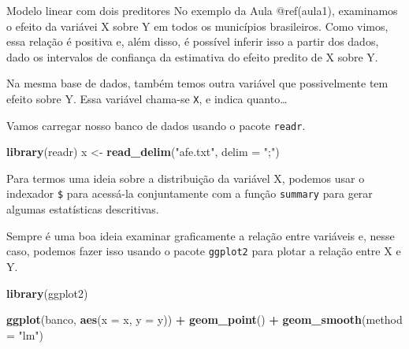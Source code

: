 \documentclass[
  9pt,
  ignorenonframetext,
  aspectratio=169]{beamer}
\newenvironment{Shaded}{\begin{snugshade}}{\end{snugshade}}
\newcommand{\DataTypeTok}[1]{\textcolor[rgb]{0.13,0.29,0.53}{#1}}
\newcommand{\KeywordTok}[1]{\textcolor[rgb]{0.13,0.29,0.53}{\textbf{#1}}}
\newcommand{\NormalTok}[1]{#1}
\newcommand{\OperatorTok}[1]{\textcolor[rgb]{0.81,0.36,0.00}{\textbf{#1}}}
\newcommand{\StringTok}[1]{\textcolor[rgb]{0.31,0.60,0.02}{#1}}
\begin{document}
\begin{frame}[fragile]{Modelo linear com dois preditores}
\protect\hypertarget{modelo-linear-com-dois-preditores}{}
No exemplo da Aula @ref(aula1), examinamos o efeito da variávei X sobre
Y em todos os municípios brasileiros. Como vimos, essa relação é
positiva e, além disso, é possível inferir isso a partir dos dados, dado
os intervalos de confiança da estimativa do efeito predito de X sobre Y.

Na mesma base de dados, também temos outra variável que possivelmente
tem efeito sobre Y. Essa variável chama-se \texttt{X}, e indica
quanto\ldots{}

Vamos carregar nosso banco de dados usando o pacote \texttt{readr}.

\begin{Shaded}
\begin{Highlighting}[]
\KeywordTok{library}\NormalTok{(readr)}
\NormalTok{x \textless{}{-}}\StringTok{ }\KeywordTok{read\_delim}\NormalTok{(}\StringTok{"afe.txt"}\NormalTok{, }\DataTypeTok{delim =} \StringTok{";"}\NormalTok{)}
\end{Highlighting}
\end{Shaded}

Para termos uma ideia sobre a distribuição da variável X, podemos usar o
indexador \texttt{\$} para acessá-la conjuntamente com a função
\texttt{summary} para gerar algumas estatísticas descritivas.

\begin{Shaded}
\end{Shaded}

Sempre é uma boa ideia examinar graficamente a relação entre variáveis
e, nesse caso, podemos fazer isso usando o pacote \texttt{ggplot2} para
plotar a relação entre X e Y.

\begin{Shaded}
\begin{Highlighting}[]
\KeywordTok{library}\NormalTok{(ggplot2)}

\KeywordTok{ggplot}\NormalTok{(banco, }\KeywordTok{aes}\NormalTok{(}\DataTypeTok{x =}\NormalTok{ x, }\DataTypeTok{y =}\NormalTok{ y)) }\OperatorTok{+}\StringTok{ }
\StringTok{  }\KeywordTok{geom\_point}\NormalTok{() }\OperatorTok{+}\StringTok{ }
\StringTok{  }\KeywordTok{geom\_smooth}\NormalTok{(}\DataTypeTok{method =} \StringTok{"lm"}\NormalTok{) }
\end{Highlighting}
\end{Shaded}


\end{frame}
\end{document}
